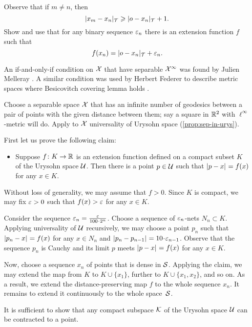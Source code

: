 Observe that if $m\ne n$, then
\[|x_m-x_n|_{\mathcal{T}}\geqslant |o-x_n|_{\mathcal{T}}+1.\]
Show and use that for any binary sequence $\varepsilon_n$ there is an extension function $f$ such that 
\[f(x_n)=|o-x_n|_{\mathcal{T}}+\varepsilon_n.\]


An if-and-only-if condition on $\mathcal{X}$ that have separable $\mathcal{X}^\infty$ was found by Julien Melleray \cite[2.8]{melleray}.
A similar condition was used by Herbert Federer to describe metric spaces where Besicovitch covering lemma holds \cite[2.8.9]{federer}.

Choose a separable space $\mathcal{X}$ that has an infinite number of geodesics between a pair of points with the given distance between them;
say a square in $\mathbb{R}^2$ with $\ell^\infty$-metric will do.
Apply to $\mathcal{X}$ universality of Urysohn space (\ref{prop:sep-in-urys}).

First let us prove the following claim:

\begin{itemize}
\item 
Suppose $f\colon K\to\mathbb{R}$ is an extension function defined on a compact subset $K$ of the Urysohn space $\mathcal{U}$.
Then there is a point $p\in \mathcal{U}$ such that 
$\dist{p}{x}{}=f(x)$ for any $x\in K$.
\end{itemize}

Without loss of generality, we may assume that $f>0$.
Since $K$ is compact, we may fix $\varepsilon>0$ such that $f(x)>\varepsilon$ for any $x\in K$.

Consider the sequence $\eps_n=\tfrac\eps{100\cdot 2^n}$.
Choose a sequence of $\varepsilon_n$-nets $N_n\subset K$.
Applying universality of $\mathcal{U}$ recursively, we may choose a point $p_n$ such that $\dist{p_n}{x}{}=f(x)$ for any $x\in N_n$ and $\dist{p_n}{p_{n-1}}{}\z=10\cdot\eps_{n-1}$.
Observe that the sequence $p_n$ is Cauchy and its limit $p$ meets 
$\dist{p}{x}{}=f(x)$ for any $x\in K$.

Now, choose a sequence $x_n$ of points that is dense in $\mathcal{S}$.
Applying the claim, we may extend the map from $K$ to $K\cup\{x_1\}$, further to $K\cup\{x_1,x_2\}$, and so on.
As a result, we extend the distance-preserving map $f$ to the whole sequence $x_n$.
It remains to extend it continuously to the whole space~$\mathcal{S}$.

It is sufficient to show that any compact subspace $\mathcal{K}$ of the Urysohn space $\mathcal{U}$ can be contracted to a point.

